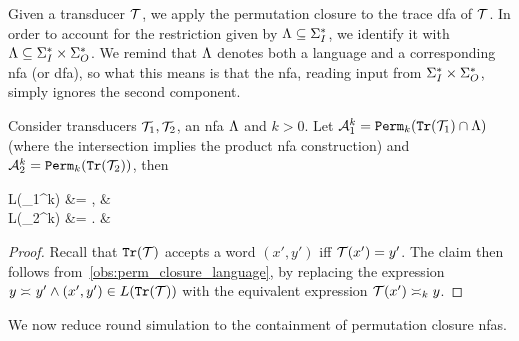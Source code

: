Given a transducer $\cT$, we apply the permutation closure to the trace \gls{dfa} of $\cT$. In order to account for the restriction given by $\fL\subseteq \sI^*$, we identify it with $\fL \subseteq \sI^*\times \sO^*$. We remind that $\fL$ denotes both a language and a corresponding \gls{nfa} (or \gls{dfa}), so what this means is that the \gls{nfa}, reading input from $\sI^*\times \sO^*$, simply ignores the second component.
\begin{lemma}
	\label{lem:permutation_closure_construction}
	Consider transducers $\cT_1,\cT_2$, an \gls{nfa} $\fL$ and $k>0$. Let $\cA_1^k=\perm_k(\tr(\cT_1)\cap\fL)$ (where the intersection implies the product \gls{nfa} construction) and $\cA_2^k=\perm_k(\tr(\cT_2))$, then 
	\small
	\begin{flalign*}
	    L(\cA_1^k) &= , & \\
	    L(\cA_2^k) &= . &
	\end{flalign*}
\end{lemma}
\begin{proof}
	Recall that $\tr(\cT)$ accepts a word $(x',y')$ iff $\cT(x')=y'$. The claim then follows from~\cref{obs:perm_closure_language}, by replacing the expression $y\req y' \wedge (x',y')\in L(\tr(\cT))$ with the equivalent expression $\cT(x')\req[k] y$.
\end{proof}

We now reduce round simulation to the containment of permutation closure \glspl{nfa}.

